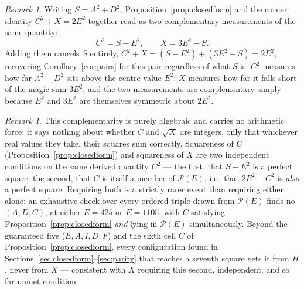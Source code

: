 \documentclass[12pt]{article}
\theoremstyle{remark}
\newtheorem{remark}[theorem]{Remark}
\begin{document}
\begin{remark}
Writing $S=A^2+D^2$, Proposition~\ref{prop:closedform} and the corner
identity $C^2+X=2E^2$ together read as two complementary measurements
of the same quantity:
\[
C^2 = S - E^2, \qquad X = 3E^2 - S .
\]
Adding them cancels $S$ entirely, $C^2+X = (S-E^2)+(3E^2-S) = 2E^2$,
recovering Corollary~\ref{cor:pairs} for this pair regardless of what
$S$ is. $C^2$ measures how far $A^2+D^2$ sits above the centre value
$E^2$; $X$ measures how far it falls short of the magic sum $3E^2$; and
the two measurements are complementary simply because $E^2$ and $3E^2$
are themselves symmetric about $2E^2$.
\end{remark}

\begin{remark}
This complementarity is purely algebraic and carries no arithmetic
force: it says nothing about whether $C$ and $\sqrt X$ are integers,
only that whichever real values they take, their squares sum correctly.
Squareness of $C$ (Proposition~\ref{prop:closedform}) and squareness of
$X$ are two independent conditions on the same derived quantity $C^2$
--- the first, that $S-E^2$ is a perfect square; the second, that $C$
is itself a member of $\mathcal P(E)$, i.e.\ that $2E^2-C^2$ is
\emph{also} a perfect square. Requiring both is a strictly rarer event
than requiring either alone: an exhaustive check over every ordered
triple drawn from $\mathcal P(E)$ finds no $(A,D,C)$, at either
$E=425$ or $E=1105$, with $C$ satisfying Proposition~\ref{prop:closedform}
\emph{and} lying in $\mathcal P(E)$ simultaneously. Beyond the
guaranteed five ($E,A,I,D,F$) and the sixth cell $C$ of
Proposition~\ref{prop:closedform}, every configuration found in
Sections~\ref{sec:closedform}--\ref{sec:parity} that reaches a seventh
square gets it from $H$, never from $X$ --- consistent with $X$
requiring this second, independent, and so far unmet condition.


\end{remark}
\end{document}
